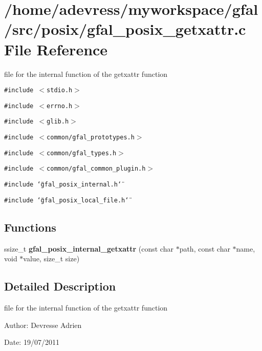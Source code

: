\section{/home/adevress/myworkspace/gfal/src/posix/gfal\_\-posix\_\-getxattr.c File Reference}
\label{gfal__posix__getxattr_8c}
file for the internal function of the getxattr function 

{\tt \#include $<$stdio.h$>$}\par
{\tt \#include $<$errno.h$>$}\par
{\tt \#include $<$glib.h$>$}\par
{\tt \#include $<$common/gfal\_\-prototypes.h$>$}\par
{\tt \#include $<$common/gfal\_\-types.h$>$}\par
{\tt \#include $<$common/gfal\_\-common\_\-plugin.h$>$}\par
{\tt \#include \char`\"{}gfal\_\-posix\_\-internal.h\char`\"{}}\par
{\tt \#include \char`\"{}gfal\_\-posix\_\-local\_\-file.h\char`\"{}}\par
\subsection*{Functions}
\begin{CompactItemize}
\item 
ssize\_\-t \textbf{gfal\_\-posix\_\-internal\_\-getxattr} (const char $\ast$path, const char $\ast$name, void $\ast$value, size\_\-t size)\label{gfal__posix__getxattr_8c_ca798d7e3e0e14d6992669e7c125347f}

\end{CompactItemize}


\subsection{Detailed Description}
file for the internal function of the getxattr function 

\begin{Desc}
\item[Author:]Devresse Adrien \end{Desc}
\begin{Desc}
\item[Date:]19/07/2011 \end{Desc}
